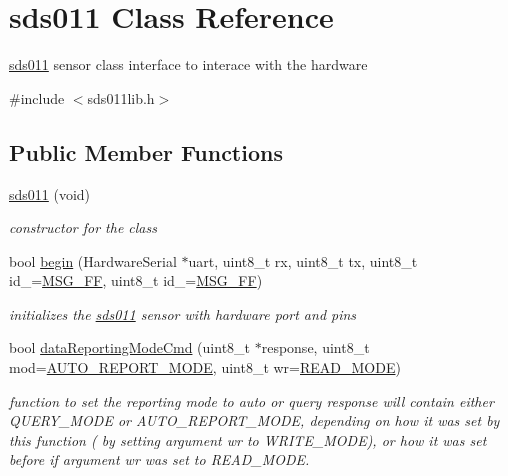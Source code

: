\hypertarget{classsds011}{}\section{sds011 Class Reference}
\label{classsds011}


\mbox{\hyperlink{classsds011}{sds011}} sensor class interface to interace with the hardware  




{\ttfamily \#include $<$sds011lib.\+h$>$}

\subsection*{Public Member Functions}
\begin{DoxyCompactItemize}
\item 
\mbox{\label{classsds011_ae552c4c94bf5496db36fc0b31b574322}} 
\mbox{\hyperlink{classsds011_ae552c4c94bf5496db36fc0b31b574322}{sds011}} (void)
\begin{DoxyCompactList}\small\item\em constructor for the class \end{DoxyCompactList}\item 
bool \mbox{\hyperlink{classsds011_a28daf4c12e7757c1afdf37fe4a1ece87}{begin}} (Hardware\+Serial $\ast$uart, uint8\+\_\+t rx, uint8\+\_\+t tx, uint8\+\_\+t id\+\_=\mbox{\hyperlink{sds011lib_8h_a87c3ec3696c2e8a2489b9930871469b4}{M\+S\+G\+\_\+\+FF}}, uint8\+\_\+t id\+\_=\mbox{\hyperlink{sds011lib_8h_a87c3ec3696c2e8a2489b9930871469b4}{M\+S\+G\+\_\+\+FF}})
\begin{DoxyCompactList}\small\item\em initializes the \mbox{\hyperlink{classsds011}{sds011}} sensor with hardware port and pins \end{DoxyCompactList}\item 
bool \mbox{\hyperlink{classsds011_a5c5ba9739e019b5a877e5800d648a41f}{data\+Reporting\+Mode\+Cmd}} (uint8\+\_\+t $\ast$response, uint8\+\_\+t mod=\mbox{\hyperlink{sds011lib_8h_aa7af1453a9caa4f85b40e2e386c741ba}{A\+U\+T\+O\+\_\+\+R\+E\+P\+O\+R\+T\+\_\+\+M\+O\+DE}}, uint8\+\_\+t wr=\mbox{\hyperlink{sds011lib_8h_a064cc7153fdb5596b2079d865dd9e055}{R\+E\+A\+D\+\_\+\+M\+O\+DE}})
\begin{DoxyCompactList}\small\item\em function to set the reporting mode to auto or query response will contain either Q\+U\+E\+R\+Y\+\_\+\+M\+O\+DE or A\+U\+T\+O\+\_\+\+R\+E\+P\+O\+R\+T\+\_\+\+M\+O\+DE, depending on how it was set by this function ( by setting argument wr to W\+R\+I\+T\+E\+\_\+\+M\+O\+DE), or how it was set before if argument wr was set to R\+E\+A\+D\+\_\+\+M\+O\+DE. \end{DoxyCompactList}\item 

\end{DoxyCompactItemize}
